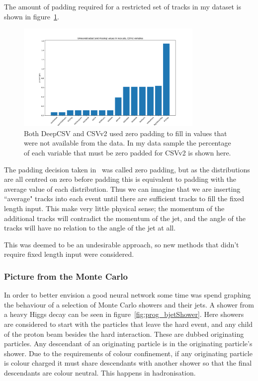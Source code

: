 The amount of padding required for a restricted set of tracks in my dataset is shown in figure~\ref{fig:prog_unreconstructed}.
\begin{figure}
    \centering
    \includegraphics[width=0.8\textwidth]{images/prog_unreconstructed.png}
    \caption{Both DeepCSV and CSVv2 used zero padding to fill in values that were not available from the data. In my data sample the percentage of each variable that must be zero padded for CSVv2 is shown here.}
    \label{fig:prog_unreconstructed}
\end{figure}

The padding decision taken in~\cite{CMS_CSVDeepCSV13TeV} was called zero padding, 
but as the distributions are all centred on zero before padding this is equivalent to padding with the average value of each distribution.
Thus we can imagine that we are inserting ``average" tracks into each event until there are sufficient tracks to fill the fixed length input.
This make very little physical sense; the momentum of the additional tracks will contradict the momentum of the jet, and the angle of the tracks
will have no relation to the angle of the jet at all.

This was deemed to be an undesirable approach, so new methods that didn't require fixed length input were considered.

\subsubsection{Picture from the Monte Carlo}

In order to better envision a good neural network some time was spend graphing the behaviour of a selection of Monte Carlo showers and their jets.
A shower from a heavy Higgs decay can be seen in figure~\ref{fig:prog_bjetShower}.
Here showers are considered to start with the particles that leave the hard event, and any child of the proton beam besides the hard interaction.
These are dubbed originating particles. 
Any descendant of an originating particle is in the originating particle's shower.
Due to the requirements of colour confinement, if any originating particle is colour charged it must share descendants with another shower
so that the final descendants are colour neutral.
This happens in hadronisation.

